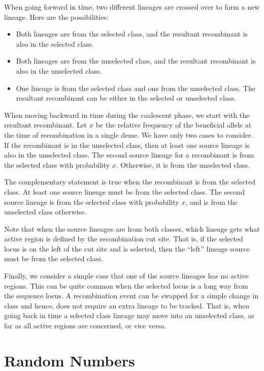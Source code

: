 \documentclass{article}
\begin{document}
When going forward in time, two different lineages are crossed over to form a
new lineage. Here are the  possibilities:
\begin{itemize}
  \item Both lineages are from the selected class, and the resultant
  recombinant is also in the selected class.
  \item Both lineages are from the unselected class, and the resultant
  recombinant is also in the unselected class.
  \item One lineage is from the selected class and one from the unselected
  class. The resultant recombinant can be either in the selected or unselected
  class. 
\end{itemize}
When moving backward in time during the coalescent phase, we start with the
resultant recombinant. Let $x$ be the relative frequency of the beneficial
allele at the time of recombination in a single deme. We have only two 
cases to consider. If the recombinant is in the unselected class, then at least
one source lineage is also in the unselected class. The second source lineage
for a recombinant is from the selected class with probability $x$. Otherwise, it
is from the unselected class. 

The complementary statement is true when the recombinant is from the selected
class. At least one source lineage must be from the selected class. The second
source lineage is from the selected class with probability $x$, and is from the
unselected class otherwise. 

Note that when the source lineages are from both classes, which lineage gets
what active region is defined by the recombination cut site. That is, if the
selected locus is on the left of the cut site and is selected, then the
``left'' lineage source must be from the selected class. 

Finally, we consider a simple case that one of the source lineages has no active
regions. This can be quite common when the selected locus is a long way from the
sequence locus. A recombination event can be swapped for a simple change in class
and hence, does not require an extra lineage to be tracked. That is, when
going back in time a selected class lineage may move into an unselected class,
as far as all active regions are concerned, or vice versa.

\section{Random Numbers}
\end{document}
